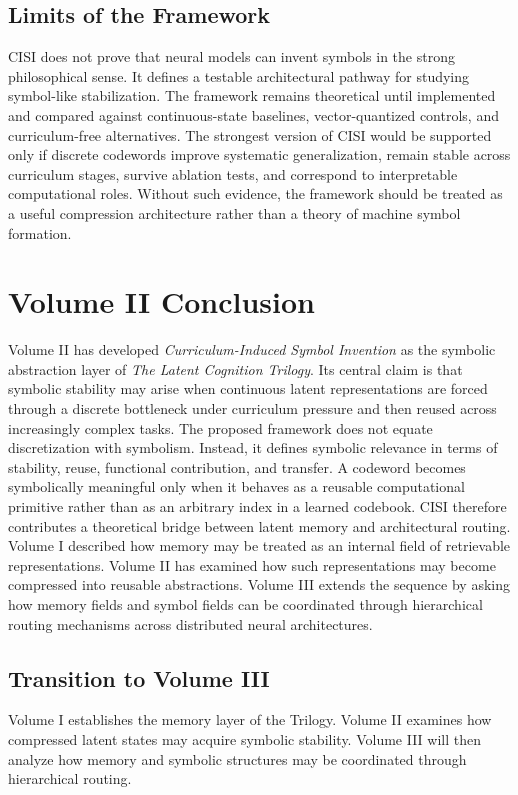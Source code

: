 \section{Limits of the Framework}
CISI does not prove that neural models can invent symbols in the strong philosophical sense. It defines a testable architectural pathway for studying symbol-like stabilization. The framework remains theoretical until implemented and compared against continuous-state baselines, vector-quantized controls, and curriculum-free alternatives.
The strongest version of CISI would be supported only if discrete codewords improve systematic generalization, remain stable across curriculum stages, survive ablation tests, and correspond to interpretable computational roles. Without such evidence, the framework should be treated as a useful compression architecture rather than a theory of machine symbol formation.
\chapter{Volume II Conclusion}
Volume II has developed \textit{Curriculum-Induced Symbol Invention} as the symbolic abstraction layer of \textit{The Latent Cognition Trilogy}. Its central claim is that symbolic stability may arise when continuous latent representations are forced through a discrete bottleneck under curriculum pressure and then reused across increasingly complex tasks.
The proposed framework does not equate discretization with symbolism. Instead, it defines symbolic relevance in terms of stability, reuse, functional contribution, and transfer. A codeword becomes symbolically meaningful only when it behaves as a reusable computational primitive rather than as an arbitrary index in a learned codebook.
CISI therefore contributes a theoretical bridge between latent memory and architectural routing. Volume I described how memory may be treated as an internal field of retrievable representations. Volume II has examined how such representations may become compressed into reusable abstractions. Volume III extends the sequence by asking how memory fields and symbol fields can be coordinated through hierarchical routing mechanisms across distributed neural architectures.
\section{Transition to Volume III}
Volume I establishes the memory layer of the Trilogy. Volume II examines how compressed latent states may acquire symbolic stability. Volume III will then analyze how memory and symbolic structures may be coordinated through hierarchical routing.


% 
% 
